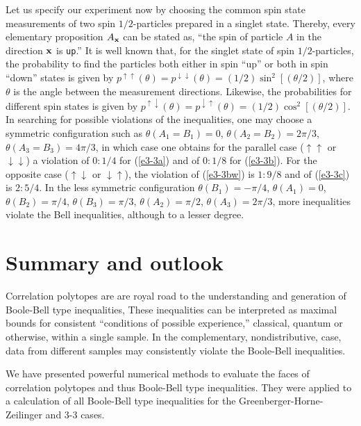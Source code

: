 Let us specify our experiment now by choosing
the common spin state measurements of two spin $1/2$-particles prepared in a singlet state.
Thereby, every elementary proposition $A_{\bf x}$ can be stated as,
``the spin of  particle $A$ in the direction $\bf x$ is {\tt up}.''
It is well known that, for the singlet state of spin $1/2$-particles, the probability
to find the particles  both either in spin ``up'' or both in spin ``down'' states
is given by
$
p^{\uparrow \uparrow} (\theta)=
p^{\downarrow \downarrow} (\theta)=
(1/2)\sin^2[(\theta /2)]
$, where $\theta$ is the angle between the measurement directions.
Likewise, the probabilities for different spin states is given by
$
p^{\uparrow \downarrow} (\theta)=
p^{\downarrow \uparrow} (\theta)=
(1/2)\cos^2[(\theta /2)]
$.
In searching for possible violations of the inequalities,
one may choose a symmetric configuration such as
$\theta(A_1 = B_1) = 0$,
$\theta(A_2 = B_2) = 2\pi / 3 $,
$\theta(A_3 = B_3) = 4\pi / 3 $,
in which case one obtains for the parallel case ($\uparrow \uparrow$ or $\downarrow \downarrow$) a violation
of
$0:1/4$ for (\ref{e3-3a}) and of
$0:1/8$ for (\ref{e3-3b}).
For the opposite case ($\uparrow \downarrow$ or $\downarrow \uparrow$), the violation of
(\ref{e3-3bw}) is $1:9/8$ and of
(\ref{e3-3c}) is $2:5/4$.
In the less symmetric configuration
$\theta(B_1) = -\pi /4$,
$\theta(A_1) = 0$,
$\theta(B_2) = \pi / 4$,
$\theta(B_3) = \pi / 3 $,
$\theta(A_2) = \pi / 2$,
$\theta(A_3) = 2\pi /3$,
more inequalities violate the Bell inequalities, although to a lesser degree.

\section{Summary and outlook}
Correlation polytopes are are royal road to the understanding and generation of Boole-Bell type inequalities,
These inequalities can be interpreted as maximal bounds for consistent  ``conditions of possible experience,''
classical, quantum or otherwise, within a single sample.
In the complementary,  nondistributive, case, data from different samples
may consistently violate the Boole-Bell inequalities.

We have presented powerful numerical methods to evaluate the faces of correlation polytopes and thus Boole-Bell type
inequalities.
They were applied to a calculation of all
Boole-Bell type inequalities for the Greenberger-Horne-Zeilinger and 3-3 cases.




%



